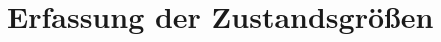 \ifx\FORMAT\undefined


\fi

\chapter{Erfassung der Zustandsgrößen}
\newpage

\newpage

\newpage



\ifx\FORMAT\undefined

\fi
